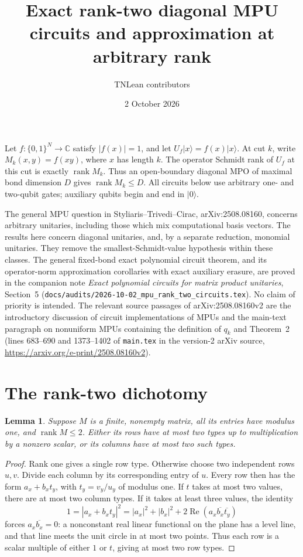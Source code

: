 \documentclass[11pt]{article}
\title{Exact rank-two diagonal MPU circuits and approximation at arbitrary rank}
\author{TNLean contributors}
\date{2 October 2026}
\newtheorem{lemma}{Lemma}
\begin{document}
\maketitle

Let $f:\{0,1\}^N\to\mathbb C$ satisfy $|f(x)|=1$, and let
$U_f|x\rangle=f(x)|x\rangle$. At cut $k$, write
$M_k(x,y)=f(xy)$, where $x$ has length $k$. The operator Schmidt rank of
$U_f$ at this cut is exactly $\operatorname{rank}M_k$. Thus an
open-boundary diagonal MPO of maximal bond dimension $D$ gives
$\operatorname{rank}M_k\leq D$. All circuits below use arbitrary one- and
two-qubit gates; auxiliary qubits begin and end in $|0\rangle$.

The general MPU question in Styliaris--Trivedi--Cirac,
arXiv:2508.08160, concerns arbitrary unitaries, including those which
mix computational basis vectors. The results here concern diagonal unitaries,
and, by a separate reduction, monomial unitaries. They remove the
smallest-Schmidt-value hypothesis within these classes. The general fixed-bond
exact polynomial circuit theorem, and its operator-norm approximation
corollaries with exact auxiliary erasure, are proved in the companion note
\emph{Exact polynomial circuits for matrix product unitaries}, Section~5
(\nolinkurl{docs/audits/2026-10-02_mpu_rank_two_circuits.tex}).
No claim of priority is intended. The relevant source
passages of arXiv:2508.08160v2 are the introductory discussion of
circuit implementations of MPUs and the main-text paragraph on nonuniform
MPUs containing the definition of $q_k$ and Theorem~2 (lines 683--690
and 1373--1402 of \texttt{main.tex} in the version-2 arXiv source,
\url{https://arxiv.org/e-print/2508.08160v2}).

\section{The rank-two dichotomy}

\begin{lemma}\label{lem:circle}
Suppose $M$ is a finite, nonempty matrix, all its entries have modulus one,
and $\operatorname{rank}M\leq2$. Either its rows have at most two types
up to multiplication by a nonzero scalar, or its columns have at most two
such types.
\end{lemma}
\begin{proof}
Rank one gives a single row type. Otherwise choose two independent rows
$u,v$. Divide each column by its corresponding entry of $u$. Every row
then has the form $a_x+b_x t_y$, with $t_y=v_y/u_y$ of modulus one.
If $t$ takes at most two values, there are at most two column types.
If it takes at least three values, the identity
\[
 1=|a_x+b_x t_y|^2
   =|a_x|^2+|b_x|^2+2\operatorname{Re}(a_x\overline{b_x}\overline{t_y})
\]
forces $a_x\overline{b_x}=0$: a nonconstant real linear functional
on the plane has a level line, and that line meets the unit circle in
at most two points. Thus each row is a scalar multiple of either $1$ or
$t$, giving at most two row types.
\end{proof}
\end{document}
